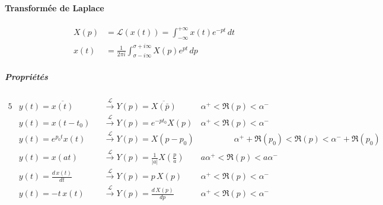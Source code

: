 \paragraph{Transformée de Laplace} \begin{align*}X(p) &=\mathcal{L}(x(t))=\int_{-\infty}^ {+\infty}x(t)e^ {-pt}\,dt\\
x(t) &= \frac{1}{2\pi i}\int_{\sigma-i\infty}^ {\sigma+i\infty}X(p)e^{pt}\,dp
\end{align*}
\subparagraph{Propriétés} \begin{alignat*}{5}
& y(t)=\overline{x(t)} &&\overset{\mathcal{L}}{\rightarrow} Y(p)=\overline{X(\bar{p})} & \alpha^+<\Re(p)<\alpha^-\\
& y(t)=x(t-t_0) &&\overset{\mathcal{L}}{\rightarrow} Y(p)=e^{-pt_0}X(p) & \alpha^+<\Re(p)<\alpha^- \\
& y(t)=e^{p_0t}x(t) &&\overset{\mathcal{L}}{\rightarrow} Y(p)= X(p-p_0) & \qquad\qquad\alpha^++\Re(p_0)<\Re(p)<\alpha^-+\Re(p_0)\\
& y(t)=x(at) &&\overset{\mathcal{L}}{\rightarrow} Y(p) = \frac{1}{|a|}X\left(\frac{p}{a}\right) & a\alpha^+<\Re(p)<a\alpha^-\\
& y(t)=\frac{d\,x(t)}{dt} &&\overset{\mathcal{L}}{\rightarrow} Y(p) =p\,X(p) & \alpha^+<\Re(p)<\alpha^-\\
& y(t)=-t\,x(t) &&\overset{\mathcal{L}}{\rightarrow}  Y(p)=\frac{d\,X(p)}{dp} & \alpha^+<\Re(p)<\alpha^-\\
\end{alignat*}
